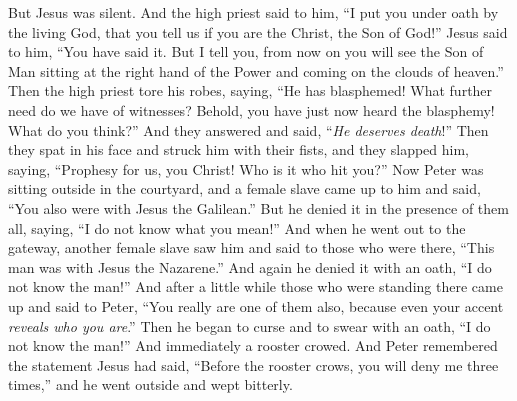 \begin{biblechapter}
\verse But Jesus was silent. And the high priest said to him, “I put you under oath by the living God, that you tell us if you are the Christ, the Son of God!”
\verse Jesus said to him, “You have said it. But I tell you, from now on you will see the Son of Man sitting at the right hand of the Power and coming on the clouds of heaven.”
\verse Then the high priest tore his robes, saying, “He has blasphemed! What further need do we have of witnesses? Behold, you have just now heard the blasphemy!
\verse What do you think?” And they answered and said, “\textit{He deserves death}!”
\verse Then they spat in his face and struck him with their fists, and they slapped him,
\verse saying, “Prophesy for us, you Christ! Who is it who hit you?”
 Now Peter was sitting outside in the courtyard, and a female slave came up to him and said, “You also were with Jesus the Galilean.”
\verse But he denied it in the presence of them all, saying, “I do not know what you mean!”
\verse And when he went out to the gateway, another female slave saw him and said to those who were there, “This man was with Jesus the Nazarene.”
\verse And again he denied it with an oath, “I do not know the man!”
\verse And after a little while those who were standing there came up and said to Peter, “You really are one of them also, because even your accent \textit{reveals who you are}.”
\verse Then he began to curse and to swear with an oath, “I do not know the man!” And immediately a rooster crowed.
\verse And Peter remembered the statement Jesus had said, “Before the rooster crows, you will deny me three times,” and he went outside and wept bitterly.
\end{biblechapter}

